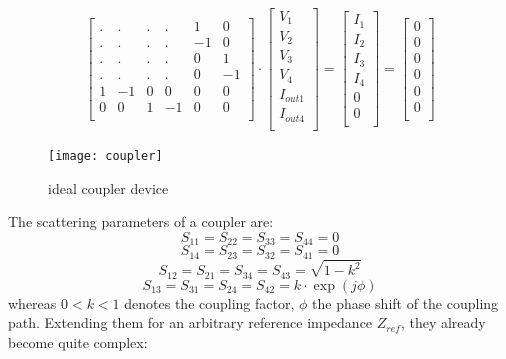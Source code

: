 \begin{equation}
\begin{bmatrix}
.&.&.&.& 1 & 0\\
.&.&.&.&-1 & 0\\
.&.&.&.& 0 & 1\\
.&.&.&.& 0 &-1\\
1 &-1 & 0 &  0 & 0 & 0\\
0 & 0 & 1 & -1 & 0 & 0\\
\end{bmatrix}
\cdot
\begin{bmatrix}
V_{1}\\
V_{2}\\
V_{3}\\
V_{4}\\
I_{out1}\\
I_{out4}\\
\end{bmatrix}
=
\begin{bmatrix}
I_{1}\\
I_{2}\\
I_{3}\\
I_{4}\\
0\\
0\\
\end{bmatrix}
=
\begin{bmatrix}
0\\
0\\
0\\
0\\
0\\
0\\
\end{bmatrix}
\end{equation}

\begin{figure}[ht]
\begin{center}
\texttt{[image: coupler]}
\end{center}
\caption{ideal coupler device}
\label{fig:coupler}
\end{figure}
\FloatBarrier

The scattering parameters of a coupler are:
\begin{equation}
S_{11} = S_{22} = S_{33} = S_{44} = 0
\end{equation}
\begin{equation}
S_{14} = S_{23} = S_{32} = S_{41} = 0
\end{equation}
\begin{equation}
S_{12} = S_{21} = S_{34} = S_{43} = \sqrt{1-k^2}
\end{equation}
\begin{equation}
S_{13} = S_{31} = S_{24} = S_{42} = k\cdot \exp\left(j\phi\right)
\end{equation}
whereas $0<k<1$ denotes the coupling factor, $\phi$ the phase shift of
the coupling path.  Extending them for an arbitrary reference
impedance $Z_{ref}$, they already become quite complex:

